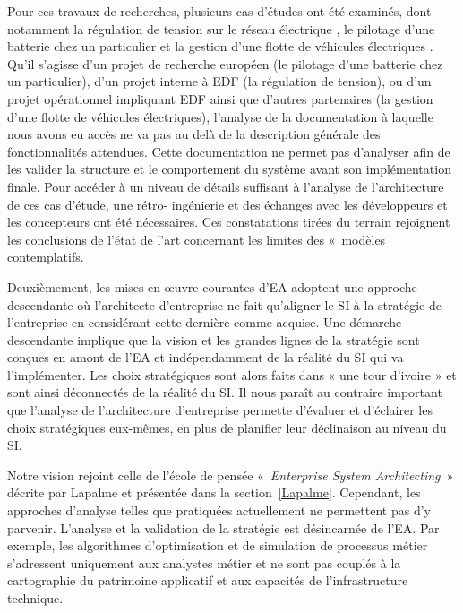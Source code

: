 Pour ces travaux de recherches, plusieurs cas d'études ont été examinés,
dont notamment la régulation de tension sur le réseau électrique
\cite{seghiri2014simulation}, le pilotage d'une batterie chez un particulier
\cite{seghiri2012animation} et la gestion d'une flotte de véhicules électriques
\cite{seghiri2015simulation}. Qu'il s'agisse d'un projet de recherche européen
(le pilotage d'une batterie chez un particulier), d'un projet interne à EDF (la
régulation de tension), ou d'un projet opérationnel impliquant EDF ainsi que
d'autres partenaires (la gestion d'une flotte de véhicules électriques),
l'analyse de la documentation à laquelle nous avons eu accès ne va pas au delà
de la description générale des fonctionnalités attendues. Cette documentation
ne permet pas d'analyser afin de les valider la structure et le comportement du
système avant son implémentation finale. Pour accéder à un niveau de détails
suffisant à l'analyse de l'architecture de ces cas d'étude, une rétro-
ingénierie et des échanges avec les développeurs et les concepteurs ont été
nécessaires. Ces constatations tirées du terrain rejoignent les conclusions de
l'état de l'art concernant les limites des «~modèles contemplatifs.

Deuxièmement, les mises en œuvre courantes d'EA adoptent une approche
descendante où l'architecte d'entreprise ne fait qu'aligner le SI à la stratégie
de l'entreprise en considérant cette dernière comme acquise. Une démarche
descendante implique que la vision et les grandes lignes de la stratégie sont
conçues en amont de l'EA et indépendamment de la réalité du SI qui va
l'implémenter. Les choix stratégiques sont alors faits dans « une tour d'ivoire
» et sont ainsi déconnectés de la réalité du SI. Il nous paraît au contraire
important que l'analyse de l'architecture d'entreprise permette d'évaluer et
d'éclairer les choix stratégiques eux-mêmes, en plus de planifier leur
déclinaison au niveau du SI.

 Notre vision rejoint celle de l'école de pensée «~\textit{Enterprise System
Architecting}~» décrite par Lapalme \cite{lapalme2012three} et présentée dans la
section~\ref{Lapalme}. Cependant, les approches d'analyse telles que pratiquées
actuellement ne permettent pas d'y parvenir. L'analyse et la validation de la
stratégie est désincarnée de l'EA. Par exemple, les algorithmes d'optimisation
et de simulation de processus métier s'adressent uniquement aux analystes métier
et ne sont pas couplés à la cartographie du patrimoine applicatif et aux
capacités de l'infrastructure technique.

